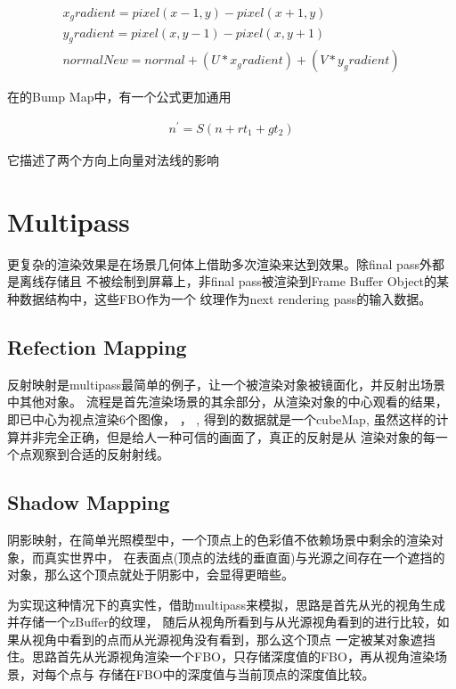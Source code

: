 \begin{gather*}
    x_gradient = pixel(x-1,y) - pixel(x+1,y) \\
    y_gradient = pixel(x,y-1) - pixel(x,y+1) \\
    normalNew = normal + (U * x_gradient) + (V * y_gradient)
\end{gather*}

在的Bump Map\cite{CGPP3ed}中，有一个公式更加通用

\begin{align*}
    n^{'} = S(n + rt_{1} + gt_{2})
\end{align*}

它描述了两个方向上向量对法线的影响

\section{Multipass}

更复杂的渲染效果是在场景几何体上借助多次渲染来达到效果。除final pass外都是离线存储且
不被绘制到屏幕上，非final pass被渲染到Frame Buffer Object的某种数据结构中，这些FBO作为一个
纹理作为next rendering pass的输入数据。

\subsection{Refection Mapping}
反射映射是multipass最简单的例子，让一个被渲染对象被镜面化，并反射出场景中其他对象。
流程是首先渲染场景的其余部分，从渲染对象的中心观看的结果，即已中心为视点渲染6个图像，
，
,
得到的数据就是一个cubeMap, 虽然这样的计算并非完全正确，但是给人一种可信的画面了，真正的反射是从
渲染对象的每一个点观察到合适的反射射线。

\subsection{Shadow Mapping}
阴影映射，在简单光照模型中，一个顶点上的色彩值不依赖场景中剩余的渲染对象，而真实世界中，
在表面点(顶点的法线的垂直面)与光源之间存在一个遮挡的对象，那么这个顶点就处于阴影中，会显得更暗些。

为实现这种情况下的真实性，借助multipass来模拟，思路是首先从光的视角生成并存储一个zBuffer的纹理，
随后从视角所看到与从光源视角看到的进行比较，如果从视角中看到的点而从光源视角没有看到，那么这个顶点
一定被某对象遮挡住。思路首先从光源视角渲染一个FBO，只存储深度值的FBO，再从视角渲染场景，对每个点与
存储在FBO中的深度值与当前顶点的深度值比较。


